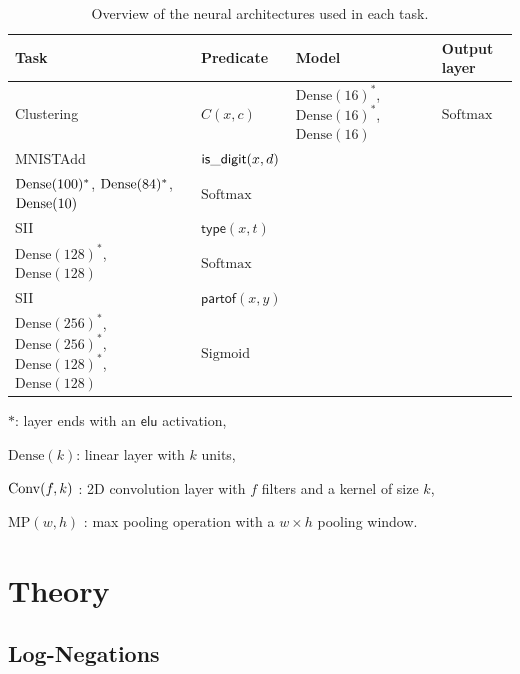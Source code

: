 \begin{table}[b]
    \centering
    \begin{tabular}{llll}
        \toprule
        Task  & Predicate & Model & Output layer \\
        \midrule
        Clustering & $C(x,c)$ & $\mathrm{Dense}(16)^\ast$, $\mathrm{Dense}(16)^\ast$, $\mathrm{Dense}(16)$ & $\mathrm{Softmax}$ \\
        MNISTAdd & $\mathsf{is\_digit}(x,d)$ & \makecell[tl]{$\Conv(6,5)^\ast$, $\mathrm{MP}(2,2)$, $\Conv(16,5)^\ast$, $\mathrm{MP}(2,2)$,\\
                 $\mathrm{Dense}(100)^\ast$, $\mathrm{Dense}(84)^\ast$, $\mathrm{Dense}(10)$} & $\mathrm{Softmax}$\\
        SII & $\mathsf{type}(x,t)$ & \makecell[tl]{$\mathrm{Dense}(512)^\ast$, $\mathrm{Dense}(256)^\ast$, $\mathrm{Dense}(256)^\ast$,\\ 
                $\mathrm{Dense}(128)^\ast$, $\mathrm{Dense}(128)$} & $\mathrm{Softmax}$ \\
        SII & $\mathsf{partof}(x,y)$ & \makecell[tl]{$\mathrm{Concat}(\mathsf{type}_{\mathrm{Model}}(x),\mathsf{type}_{\mathrm{Model}}(y))$, $\mathrm{Dense}(512)^\ast$, \\ 
                $\mathrm{Dense}(256)^\ast$, $\mathrm{Dense}(256)^\ast$, $\mathrm{Dense}(128)^\ast$, $\mathrm{Dense}(128)$}      &  $\mathrm{Sigmoid}$ \\
        \bottomrule
    \end{tabular}
    \begin{tablenotes}
        \small
        \item $\ast$: layer ends with an $\mathsf{elu}$ activation,
        \item $\mathrm{Dense}(k)$: linear layer with $k$ units,
        \item $\mathrm{Conv}(f,k)$ : 2D convolution layer with $f$ filters and a kernel of size $k$,
        \item $\mathrm{MP}(w,h)$ : max pooling operation with a $w \times h$ pooling window.
      \end{tablenotes}
    \caption{Overview of the neural architectures used in each task.}
    \label{tab:appendix_models}
\end{table}

\section{Theory}
\subsection{Log-Negations}
